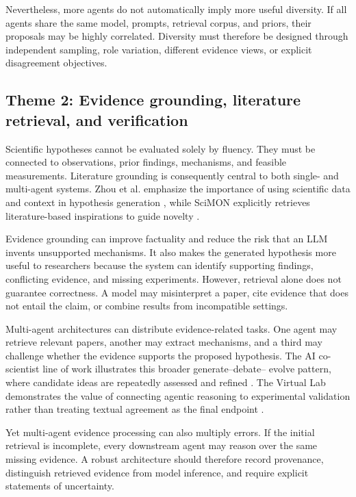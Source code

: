 \documentclass[11pt]{article}
\begin{document}
Nevertheless, more agents do not automatically imply more useful diversity. If all agents share the
same model, prompts, retrieval corpus, and priors, their proposals may be highly correlated.
Diversity must therefore be designed through independent sampling, role variation, different
evidence views, or explicit disagreement objectives.

\subsection{Theme 2: Evidence grounding, literature retrieval, and verification}
\label{subsec:evidence-grounding}

Scientific hypotheses cannot be evaluated solely by fluency. They must be connected to
observations, prior findings, mechanisms, and feasible measurements. Literature grounding is
consequently central to both single- and multi-agent systems. Zhou et al. emphasize the importance
of using scientific data and context in hypothesis generation \cite{zhou2024hypothesis}, while
SciMON explicitly retrieves literature-based inspirations to guide novelty \cite{wang2024scimon}.

Evidence grounding can improve factuality and reduce the risk that an LLM invents unsupported
mechanisms. It also makes the generated hypothesis more useful to researchers because the system
can identify supporting findings, conflicting evidence, and missing experiments. However, retrieval
alone does not guarantee correctness. A model may misinterpret a paper, cite evidence that does not
entail the claim, or combine results from incompatible settings.

Multi-agent architectures can distribute evidence-related tasks. One agent may retrieve relevant
papers, another may extract mechanisms, and a third may challenge whether the evidence supports
the proposed hypothesis. The AI co-scientist line of work illustrates this broader generate--debate--
evolve pattern, where candidate ideas are repeatedly assessed and refined \cite{gottweis2025towards}.
The Virtual Lab demonstrates the value of connecting agentic reasoning to experimental validation
rather than treating textual agreement as the final endpoint \cite{virtuallab2024}.

Yet multi-agent evidence processing can also multiply errors. If the initial retrieval is incomplete,
every downstream agent may reason over the same missing evidence. A robust architecture should
therefore record provenance, distinguish retrieved evidence from model inference, and require
explicit statements of uncertainty.
\end{document}
